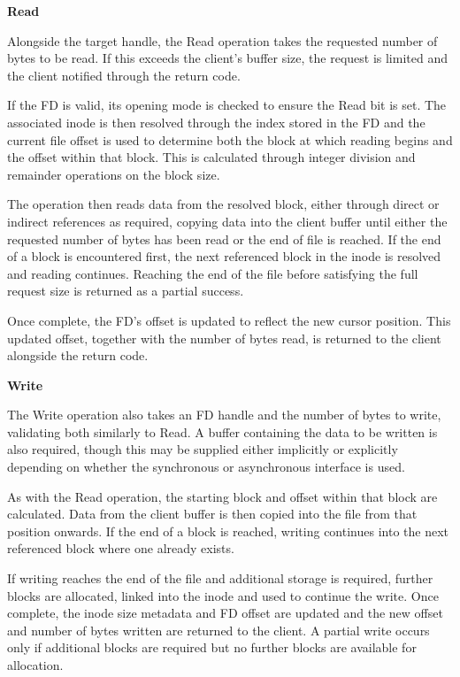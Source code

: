 \textbf{Read}

Alongside the target handle, the Read operation takes the requested number of bytes to be read. If this exceeds the client’s buffer size, the request is limited and the client notified through the return code.

If the FD is valid, its opening mode is checked to ensure the Read bit is set. The associated inode is then resolved through the index stored in the FD and the current file offset is used to determine both the block at which reading begins and the offset within that block. This is calculated through integer division and remainder operations on the block size.

The operation then reads data from the resolved block, either through direct or indirect references as required, copying data into the client buffer until either the requested number of bytes has been read or the end of file is reached. If the end of a block is encountered first, the next referenced block in the inode is resolved and reading continues. Reaching the end of the file before satisfying the full request size is returned as a partial success.

Once complete, the FD’s offset is updated to reflect the new cursor position. This updated offset, together with the number of bytes read, is returned to the client alongside the return code.

\textbf{Write}

The Write operation also takes an FD handle and the number of bytes to write, validating both similarly to Read. A buffer containing the data to be written is also required, though this may be supplied either implicitly or explicitly depending on whether the synchronous or asynchronous interface is used.

As with the Read operation, the starting block and offset within that block are calculated. Data from the client buffer is then copied into the file from that position onwards. If the end of a block is reached, writing continues into the next referenced block where one already exists.

If writing reaches the end of the file and additional storage is required, further blocks are allocated, linked into the inode and used to continue the write. Once complete, the inode size metadata and FD offset are updated and the new offset and number of bytes written are returned to the client. A partial write occurs only if additional blocks are required but no further blocks are available for allocation. 

